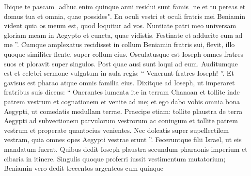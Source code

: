\begin{biblechapter}
\begin{biblechapter}
\begin{biblechapter}
\begin{biblechapter}
\begin{biblechapter}
\begin{biblechapter}
\begin{biblechapter}
\begin{biblechapter}
\begin{biblechapter}
\begin{biblechapter}
\begin{biblechapter}
\begin{biblechapter}
\begin{biblechapter}
\begin{biblechapter}
\begin{biblechapter}
\begin{biblechapter}
\begin{biblechapter}
\begin{biblechapter}
\begin{biblechapter}
\begin{biblechapter}
\begin{biblechapter}
\begin{biblechapter}
\begin{biblechapter}
\begin{biblechapter}
\begin{biblechapter}
\begin{biblechapter}
\begin{biblechapter}
\begin{biblechapter}
\begin{biblechapter}
\begin{biblechapter}
\begin{biblechapter}
\begin{biblechapter}
\begin{biblechapter}
\begin{biblechapter}
\begin{biblechapter}
\begin{biblechapter}
\begin{biblechapter}
\begin{biblechapter}
\begin{biblechapter}
\begin{biblechapter}
\begin{biblechapter}
\begin{biblechapter}
\begin{biblechapter}
\begin{biblechapter}
\begin{biblechapter}
 \verse Ibique te pascam ­ adhuc enim quinque anni residui sunt famis ­ ne et tu pereas et domus tua et omnia, quae possides". 
\verse En oculi vestri et oculi fratris mei Beniamin vident quia os meum est, quod loquitur ad vos. 
\verse Nuntiate patri meo universam gloriam meam in Aegypto et cuncta, quae vidistis. Festinate et adducite eum ad me ”.
 \verse Cumque amplexatus recidisset in collum Beniamin fratris sui, flevit, illo quoque similiter flente, super collum eius. 
\verse Osculatusque est Ioseph omnes fratres suos et ploravit super singulos. Post quae ausi sunt loqui ad eum.
 \verse Auditumque est et celebri sermone vulgatum in aula regis: “ Venerunt fratres Ioseph! ”. Et gavisus est pharao atque omnis familia eius. 
\verse Dixitque ad Ioseph, ut imperaret fratribus suis dicens: “ Onerantes iumenta ite in terram Chanaan 
\verse et tollite inde patrem vestrum et cognationem et venite ad me; et ego dabo vobis omnia bona Aegypti, ut comedatis medullam terrae. 
\verse Praecipe etiam: tollite plaustra de terra Aegypti ad subvectionem parvulorum vestrorum ac coniugum et tollite patrem vestrum et properate quantocius venientes. 
\verse Nec doleatis super supellectilem vestram, quia omnes opes Aegypti vestrae erunt ”.
 \verse Feceruntque filii Israel, ut eis mandatum fuerat. Quibus dedit Ioseph plaustra secundum pharaonis imperium et cibaria in itinere. 
\verse Singulis quoque proferri iussit vestimentum mutatorium; Beniamin vero dedit trecentos argenteos cum quinque 

\end{biblechapter}
\end{biblechapter}
\end{biblechapter}
\end{biblechapter}
\end{biblechapter}
\end{biblechapter}
\end{biblechapter}
\end{biblechapter}
\end{biblechapter}
\end{biblechapter}
\end{biblechapter}
\end{biblechapter}
\end{biblechapter}
\end{biblechapter}
\end{biblechapter}
\end{biblechapter}
\end{biblechapter}
\end{biblechapter}
\end{biblechapter}
\end{biblechapter}
\end{biblechapter}
\end{biblechapter}
\end{biblechapter}
\end{biblechapter}
\end{biblechapter}
\end{biblechapter}
\end{biblechapter}
\end{biblechapter}
\end{biblechapter}
\end{biblechapter}
\end{biblechapter}
\end{biblechapter}
\end{biblechapter}
\end{biblechapter}
\end{biblechapter}
\end{biblechapter}
\end{biblechapter}
\end{biblechapter}
\end{biblechapter}
\end{biblechapter}
\end{biblechapter}
\end{biblechapter}
\end{biblechapter}
\end{biblechapter}
\end{biblechapter}
